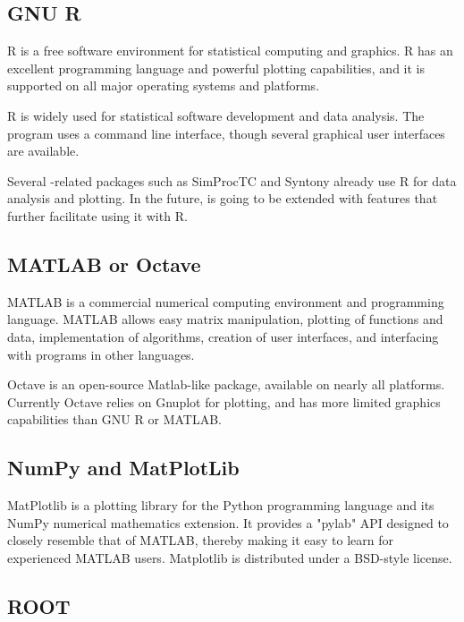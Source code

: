 \subsection{GNU R}
\label{sec:ana-sim:gnu-r}

R is a free software environment for statistical computing and graphics.
R has an excellent programming language and powerful plotting capabilities,
and it is supported on all major operating systems and platforms.

R is widely used for statistical software development and data analysis.
The program uses a command line interface, though several graphical user
interfaces are available.

Several {\opp}-related packages such as SimProcTC and Syntony already
use R for data analysis and plotting. In the future, {\opp} is going
to be extended with features that further facilitate using it with R.


\subsection{MATLAB or Octave}

MATLAB is a commercial numerical computing environment and programming language.
MATLAB allows easy matrix manipulation, plotting of functions and data,
implementation of algorithms, creation of user interfaces, and interfacing
with programs in other languages.

Octave is an open-source Matlab-like package, available on nearly all platforms.
Currently Octave relies on Gnuplot for plotting, and has more limited
graphics capabilities than GNU R or MATLAB.

\subsection{NumPy and MatPlotLib}

MatPlotlib is a plotting library for the Python programming language and
its NumPy numerical mathematics extension. It provides a "pylab" API designed
to closely resemble that of MATLAB, thereby making it easy to learn
for experienced MATLAB users. Matplotlib is distributed under a BSD-style
license.


\subsection{ROOT}

